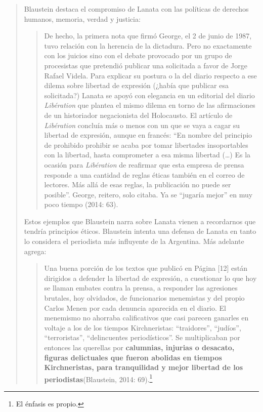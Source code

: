 \begin{quote}
Blaustein destaca el compromiso de Lanata con las políticas de derechos humanos, memoria, verdad y justicia:

\begin{quote}
	De hecho, la primera nota que firmó George, el 2 de junio de 1987, tuvo relación con la herencia de la dictadura. Pero no exactamente con los juicios sino con el debate provocado por un grupo de procesistas que pretendió publicar una solicitada a favor de Jorge Rafael Videla. Para explicar su postura o la del diario respecto a ese dilema sobre libertad de expresión (¿había que publicar esa solicitada?) Lanata se apoyó con elegancia en un editorial del diario \emph{Libération}  que plantea el mismo dilema en torno de las afirmaciones de un historiador negacionista del Holocausto. El artículo de \emph{Libération} concluía más o menos con un que se vaya a cagar su libertad de expresión, aunque en francés: \enquote{En nombre del principio de prohibido prohibir se acaba por tomar libertades insoportables con la libertad, hasta comprometer a esa misma libertad (\dots) Es la ocasión para \emph{Libération} de reafirmar que esta empresa de prensa responde a una cantidad de reglas éticas también en el correo de lectores. Más allá de esas reglas, la publicación no puede ser posible}. George, reitero, solo citaba. Ya se \enquote{jugaría mejor} en muy poco tiempo (2014: 63).
\end{quote}


Estos ejemplos que Blaustein narra sobre Lanata vienen a recordarnos que tendría principios éticos. Blaustein intenta una defensa de Lanata en tanto lo considera el periodista más influyente de la Argentina. Más adelante agrega:

\begin{quote}
	Una buena porción de los textos que publicó en Página {[}12{]} están dirigidos a defender la libertad de expresión, a cuestionar lo que hoy se llaman embates contra la prensa, a responder las agresiones brutales, hoy olvidados, de funcionarios menemistas y del propio Carlos Menen por cada denuncia aparecida en el diario. El menemismo no ahorraba calificativos que casi parecen ganarles en voltaje a los de los tiempos Kirchneristas: \enquote{traidores}, \enquote{judíos}, \enquote{terroristas}, \enquote{delincuentes periodísticos}. Se multiplicaban por entonces las querellas por \textbf{calumnias, injurias o desacato, figuras delictuales que fueron abolidas en tiempos Kirchneristas, para tranquilidad y mejor libertad de los periodistas}(Blaustein, 2014: 69).\footnote{El énfasis es propio.}
\end{quote}



\end{quote}
